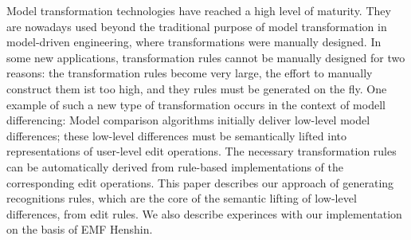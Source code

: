 Model transformation technologies have reached a high
level of maturity.
 They are nowadays used beyond the traditional purpose of
model transformation in model-driven engineering, where
transformations were manually designed.
 In some new applications, transformation rules
cannot be manually designed for two reasons: the 
transformation rules become very large, the effort to 
manually construct them ist too high, and they rules 
must be generated on the fly.
 One example of such a new type of transformation
occurs in the context of modell differencing: 
 Model comparison algorithms initially deliver low-level
model differences; these low-level differences must be
semantically lifted into representations of user-level
edit operations.
 The necessary transformation rules can be automatically
derived from rule-based implementations of the
corresponding edit operations.
 This paper describes our approach of generating
recognitions rules, which are the core of the semantic
lifting of low-level differences, from edit rules.
 We also describe experinces with our implementation on
the basis of EMF Henshin.

